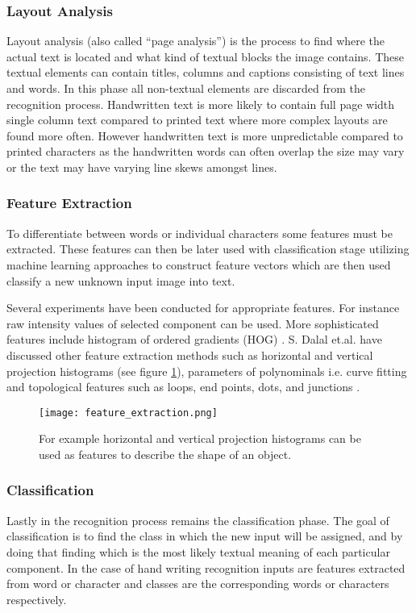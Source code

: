 \documentclass{article}
\begin{document}
      \subsubsection{Layout Analysis}
        Layout analysis (also called ``page analysis'') is the process to find where the actual text is located and what kind of textual blocks the image contains. These textual elements can contain titles, columns and captions consisting of text lines and words. In this phase all non-textual elements are discarded from the recognition process. Handwritten text is more likely to contain full page width single column text compared to printed text where more complex layouts are found more often. However handwritten text is more unpredictable compared to printed characters as the handwritten words can often overlap the size may vary or the text may have varying line skews amongst lines.

      \subsubsection{Feature Extraction}
        To differentiate between words or individual characters some features must be extracted. These features can then be later used with classification stage utilizing machine learning approaches to construct feature vectors which are then used classify a new unknown input image into text.

        Several experiments have been conducted for appropriate features. For instance raw intensity values of selected component can be used. More sophisticated features include histogram of ordered gradients (HOG) \cite{Dalal2005}. S. Dalal et.al. have discussed other feature extraction methods such as horizontal and vertical projection histograms (see figure \ref{fig:feature}), parameters of polynominals i.e. curve fitting and topological features such as loops, end points, dots, and junctions \cite{Dalal}.

        \begin{figure}[!ht]
          \centering
          \texttt{[image: feature\_extraction.png]}
          \caption{For example horizontal and vertical projection histograms can be used as features to describe the shape of an object.\label{fig:feature}}
        \end{figure}

      \subsubsection{Classification}
        Lastly in the recognition process remains the classification phase. The goal of classification is to find the class in which the new input will be assigned, and by doing that finding which is the most likely textual meaning of each particular component. In the case of hand writing recognition inputs are features extracted from word or character and classes are the corresponding words or characters respectively.
\end{document}
